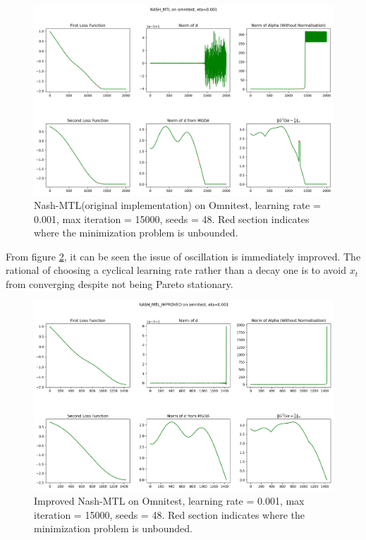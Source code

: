 \documentclass{article}
\renewcommand{\|}{\biggr|}
\begin{document}
    \begin{figure}
        \includegraphics[scale = 0.4]{src/example5.png}
        \caption{Nash-MTL(original implementation) on Omnitest, learning rate = 0.001, max iteration = 15000, seeds = 48. Red section indicates where the minimization problem is unbounded.}\label{nash_mtl_exp_3}
    \end{figure}   
    From figure \ref{nash_mtl_exp_4}, it can be seen the issue of oscillation is immediately improved. The rational of choosing a cyclical learning rate rather than a decay one is to avoid $x_t$ from converging despite not being Pareto stationary.
            \begin{figure}
        \includegraphics[scale = 0.4]{src/example6.png}
        \caption{Improved Nash-MTL on Omnitest, learning rate = 0.001, max iteration = 15000, seeds = 48. Red section indicates where the minimization problem is unbounded.}\label{nash_mtl_exp_4}
    \end{figure}   
    
\end{document}
